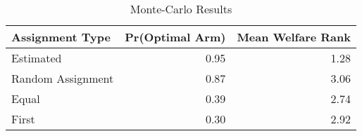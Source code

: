 
\begin{table}
    \caption{Monte-Carlo Results}
\centering
\begin{tabular}{lrr}
\toprule
Assignment Type & Pr(Optimal Arm) & Mean Welfare Rank\\
\midrule
Estimated & 0.95 & 1.28\\
Random Assignment & 0.87 & 3.06\\
Equal & 0.39 & 2.74\\
First & 0.30 & 2.92\\
\bottomrule
\end{tabular}
\end{table}
